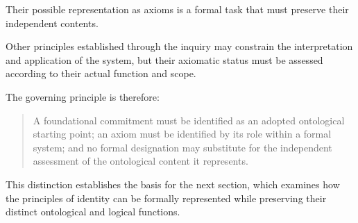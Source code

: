 Their possible representation
as axioms is a formal task
that must preserve their
independent contents.

Other principles established
through the inquiry may constrain
the interpretation and application
of the system, but their axiomatic
status must be assessed according
to their actual function and scope.

The governing principle is therefore:

\begin{quote}
A foundational commitment must
be identified as an adopted
ontological starting point;
an axiom must be identified
by its role within a formal
system; and no formal designation
may substitute for the independent
assessment of the ontological
content it represents.
\end{quote}

This distinction establishes
the basis for the next section,
which examines how the principles
of identity can be formally
represented while preserving
their distinct ontological
and logical functions.

